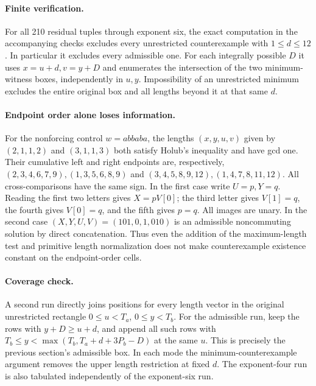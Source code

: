 \paragraph{Finite verification.}
For all 210 residual tuples through exponent six, the exact computation
in the accompanying checks excludes every unrestricted counterexample
with $1\le d\le12$. In particular it excludes every admissible one.
For each integrally possible $D$ it uses $x=u+d,v=y+D$ and enumerates
the intersection of the two minimum-witness boxes, independently in $u,y$.
Impossibility of an unrestricted minimum excludes the entire original box
and all lengths beyond it at that same $d$.

\paragraph{Endpoint order alone loses information.}
For the nonforcing control $w=abbaba$, the lengths $(x,y,u,v)$
given by $(2,1,1,2)$ and $(3,1,1,3)$ both satisfy Holub's inequality
and have gcd one. Their cumulative left and right endpoints are,
respectively, $(2,3,4,6,7,9),(1,3,5,6,8,9)$ and
$(3,4,5,8,9,12),(1,4,7,8,11,12)$.
All cross-comparisons have the same sign. In the first case write
$U=p,Y=q$. Reading the first two letters gives $X=pV[0]$;
the third letter gives $V[1]=q$, the fourth gives $V[0]=q$,
and the fifth gives $p=q$. All images are unary.
In the second case $(X,Y,U,V)=(101,0,1,010)$ is an admissible
noncommuting solution by direct concatenation. Thus even the addition
of the maximum-length test and primitive length normalization does not
make counterexample existence constant on the endpoint-order cells.

\paragraph{Coverage check.}
A second run directly joins positions for every length vector in the
original unrestricted rectangle $0\le u<T_a$, $0\le y<T_b$.
For the admissible run, keep the rows with $y+D\ge u+d$, and append
all such rows with
$T_b\le y<\max(T_b,T_a+d+3P_b-D)$ at the same $u$.
This is precisely the previous section's admissible box.
In each mode the minimum-counterexample argument removes the upper
length restriction at fixed $d$. The exponent-four run is also tabulated
independently of the exponent-six run.
